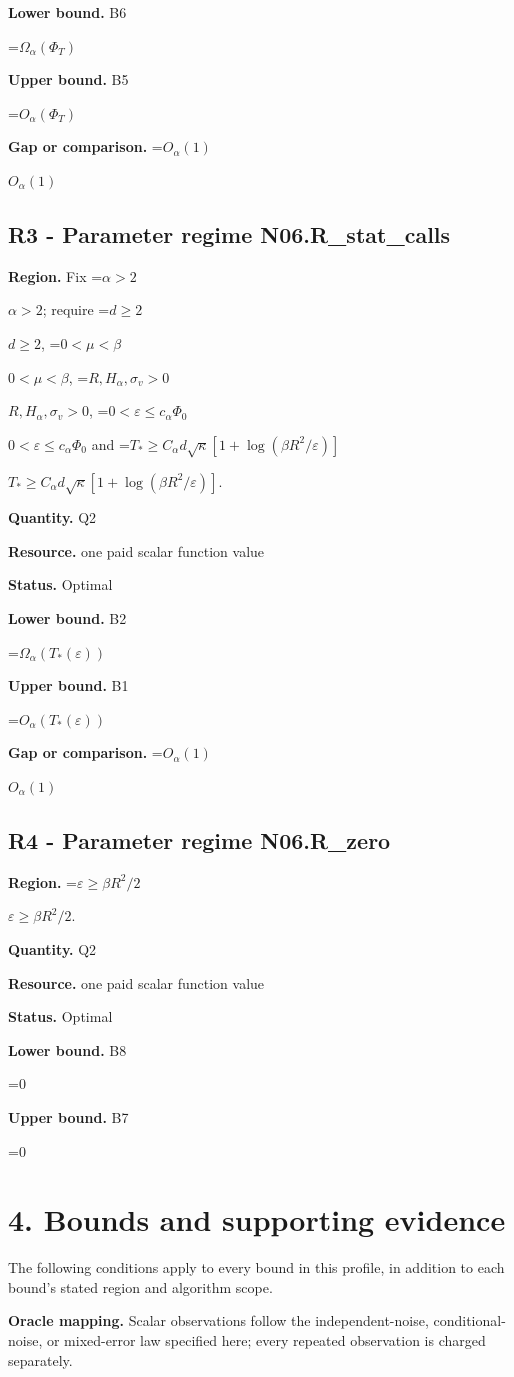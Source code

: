 \documentclass[10pt,a4paper]{article}
\newcommand{\AtlasMath}[1]{\par\begingroup\centering\setbox0=\hbox{$\displaystyle #1$}\ifdim\wd0>1.4\linewidth\typeout{ATLAS WIDE FORMULA: \the\wd0}\fi\ifdim\wd0>\linewidth\resizebox{\linewidth}{!}{\box0}\else\box0\fi\par\endgroup}
\newcommand{\AtlasInlineMath}[1]{\begingroup\setbox0=\hbox{$#1$}\ifdim\wd0>.4\linewidth\endgroup\AtlasMath{#1}\else\endgroup$#1$\fi}
\begin{document}
\textbf{Lower bound.} B6

\AtlasMath{\Omega_\alpha(\Phi_T)}
\textbf{Upper bound.} B5

\AtlasMath{O_\alpha(\Phi_T)}
\textbf{Gap or comparison.} \AtlasInlineMath{O_\alpha(1)}

\subsection{R3 - Parameter regime N06.R\_stat\_calls}
\textbf{Region.} Fix \AtlasInlineMath{\alpha>2}; require \AtlasInlineMath{d\ge2}, \AtlasInlineMath{0<\mu<\beta}, \AtlasInlineMath{R,H_\alpha,\sigma_v>0}, \AtlasInlineMath{0<\varepsilon\le c_\alpha\Phi_0} and \AtlasInlineMath{T_*\ge C_\alpha d\sqrt\kappa[1+\log(\beta R^2/\varepsilon)]}.

\textbf{Quantity.} Q2

\textbf{Resource.} one paid scalar function value

\textbf{Status.} Optimal

\textbf{Lower bound.} B2

\AtlasMath{\Omega_\alpha(T_*(\varepsilon))}
\textbf{Upper bound.} B1

\AtlasMath{O_\alpha(T_*(\varepsilon))}
\textbf{Gap or comparison.} \AtlasInlineMath{O_\alpha(1)}

\subsection{R4 - Parameter regime N06.R\_zero}
\textbf{Region.} \AtlasInlineMath{\varepsilon\ge\beta R^2/2}.

\textbf{Quantity.} Q2

\textbf{Resource.} one paid scalar function value

\textbf{Status.} Optimal

\textbf{Lower bound.} B8

\AtlasMath{0}
\textbf{Upper bound.} B7

\AtlasMath{0}
\section{4. Bounds and supporting evidence}
The following conditions apply to every bound in this profile, in addition to each bound's stated region and algorithm scope.

\textbf{Oracle mapping.} Scalar observations follow the independent-noise, conditional-noise, or mixed-error law specified here; every repeated observation is charged separately.
\end{document}
